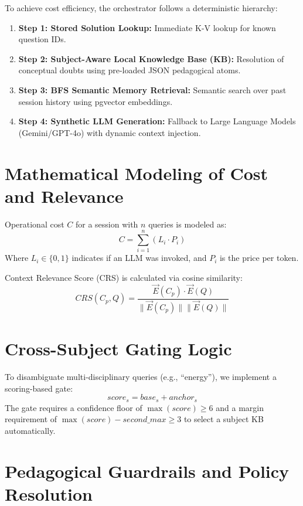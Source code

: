 To achieve cost efficiency, the orchestrator follows a deterministic hierarchy:

\begin{enumerate}
    \item \textbf{Step 1: Stored Solution Lookup:} Immediate K-V lookup for known question IDs.
    \item \textbf{Step 2: Subject-Aware Local Knowledge Base (KB):} Resolution of conceptual doubts using pre-loaded JSON pedagogical atoms.
    \item \textbf{Step 3: BFS Semantic Memory Retrieval:} Semantic search over past session history using pgvector embeddings.
    \item \textbf{Step 4: Synthetic LLM Generation:} Fallback to Large Language Models (Gemini/GPT-4o) with dynamic context injection.
\end{enumerate}

\section{Mathematical Modeling of Cost and Relevance}

Operational cost $C$ for a session with $n$ queries is modeled as:
\begin{equation}
C = \sum_{i=1}^{n} (L_i \cdot P_i)
\end{equation}
Where $L_i \in \{0,1\}$ indicates if an LLM was invoked, and $P_i$ is the price per token.

Context Relevance Score (CRS) is calculated via cosine similarity:
\begin{equation}
CRS(C_p, Q) = \frac{\vec{E}(C_p) \cdot \vec{E}(Q)}{\|\vec{E}(C_p)\| \|\vec{E}(Q)\|}
\end{equation}

\section{Cross-Subject Gating Logic}

To disambiguate multi-disciplinary queries (e.g., ``energy''), we implement a scoring-based gate:
\begin{equation}
score_s = base_s + anchor_s
\end{equation}
The gate requires a confidence floor of $\max(score) \geq 6$ and a margin requirement of $\max(score) - second\_max \geq 3$ to select a subject KB automatically.

\section{Pedagogical Guardrails and Policy Resolution}

